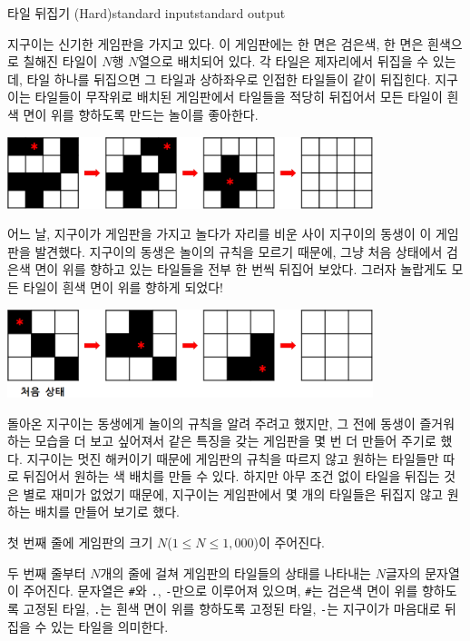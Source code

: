 \begin{problem}{타일 뒤집기 (Hard)}{standard input}{standard output}

지구이는 신기한 게임판을 가지고 있다. 이 게임판에는 한 면은 검은색, 한 면은 흰색으로 칠해진 타일이 $N$행 $N$열으로 배치되어 있다. 각 타일은 제자리에서 뒤집을 수 있는데, 타일 하나를 뒤집으면 그 타일과 상하좌우로 인접한 타일들이 같이 뒤집힌다. 지구이는 타일들이 무작위로 배치된 게임판에서 타일들을 적당히 뒤집어서 모든 타일이 흰색 면이 위를 향하도록 만드는 놀이를 좋아한다.

\begin{center}
  \includegraphics[width=0.8\textwidth]{tile1.png}
\end{center}

어느 날, 지구이가 게임판을 가지고 놀다가 자리를 비운 사이 지구이의 동생이 이 게임판을 발견했다. 지구이의 동생은 놀이의 규칙을 모르기 때문에, 그냥 처음 상태에서 검은색 면이 위를 향하고 있는 타일들을 전부 한 번씩 뒤집어 보았다. 그러자 놀랍게도 모든 타일이 흰색 면이 위를 향하게 되었다!

\begin{center}
  \includegraphics[width=0.8\textwidth]{tile2.png}
\end{center}

돌아온 지구이는 동생에게 놀이의 규칙을 알려 주려고 했지만, 그 전에 동생이 즐거워하는 모습을 더 보고 싶어져서 같은 특징을 갖는 게임판을 몇 번 더 만들어 주기로 했다. 지구이는 멋진 해커이기 때문에 게임판의 규칙을 따르지 않고 원하는 타일들만 따로 뒤집어서 원하는 색 배치를 만들 수 있다. 하지만 아무 조건 없이 타일을 뒤집는 것은 별로 재미가 없었기 때문에, 지구이는 게임판에서 몇 개의 타일들은 뒤집지 않고 원하는 배치를 만들어 보기로 했다.

\InputFile
첫 번째 줄에 게임판의 크기 $N$($1 \le N \le 1,000$)이 주어진다.

두 번째 줄부터 $N$개의 줄에 걸쳐 게임판의 타일들의 상태를 나타내는 $N$글자의 문자열이 주어진다. 문자열은 \texttt{\#}와 \texttt{.}, \texttt{-}만으로 이루어져 있으며, \texttt{\#}는 검은색 면이 위를 향하도록 고정된 타일, \texttt{.}는 흰색 면이 위를 향하도록 고정된  타일, \texttt{-}는 지구이가 마음대로 뒤집을 수 있는 타일을 의미한다.


\end{problem}
